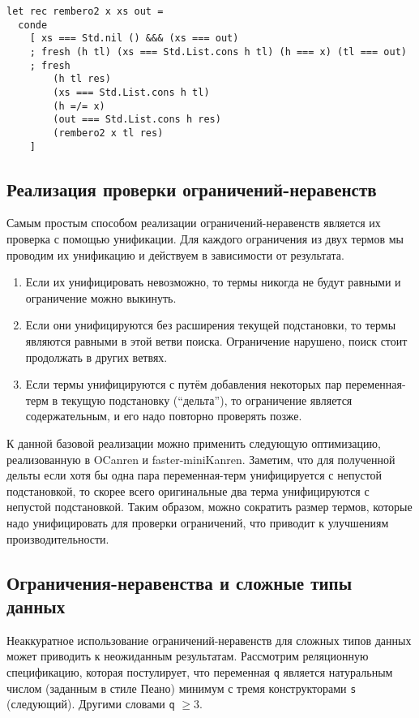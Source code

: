 \begin{lstlisting}
let rec rembero2 x xs out =
  conde
    [ xs === Std.nil () &&& (xs === out)
    ; fresh (h tl) (xs === Std.List.cons h tl) (h === x) (tl === out)
    ; fresh
        (h tl res)
        (xs === Std.List.cons h tl)
        (h =/= x)
        (out === Std.List.cons h res)
        (rembero2 x tl res)
    ]
\end{lstlisting}

\subsection{Реализация проверки ограничений-неравенств}

Самым простым способом реализации ограничений-неравенств является их проверка с помощью унификации.
Для каждого ограничения из двух термов мы проводим их унификацию и действуем в зависимости от результата.
\begin{enumerate}
\item Если их унифицировать невозможно, то термы никогда не будут равными и ограничение можно выкинуть.
\item Если они унифицируются без расширения текущей подстановки, то термы являются равными в этой ветви поиска. Ограничение нарушено, поиск стоит продолжать в других ветвях.
\item Если термы унифицируются с путём добавления некоторых пар переменная-терм в текущую подстановку (\enquote{дельта}), то ограничение является содержательным, и его надо повторно проверять позже.
\end{enumerate}

К данной базовой реализации можно применить следующую оптимизацию, реализованную в OCanren и faster-miniKanren.
Заметим, что для полученной дельты если хотя бы одна пара переменная-терм унифицируется с непустой подстановкой, то скорее всего оригинальные два терма унифицируются с непустой подстановкой. Таким образом, можно сократить размер термов, которые надо унифицировать для проверки ограничений, что приводит к улучшениям производительности.

\subsection{Ограничения-неравенства и сложные типы данных}

Неаккуратное использование ограничений-неравенств для сложных типов данных может приводить к неожиданным результатам.
Рассмотрим реляционную спецификацию, которая постулирует, что переменная \verb=q= является натуральным числом (заданным в стиле Пеано) минимум с тремя конструкторами \verb=s= (следующий).
Другими словами \verb=q= $\geq 3$.

